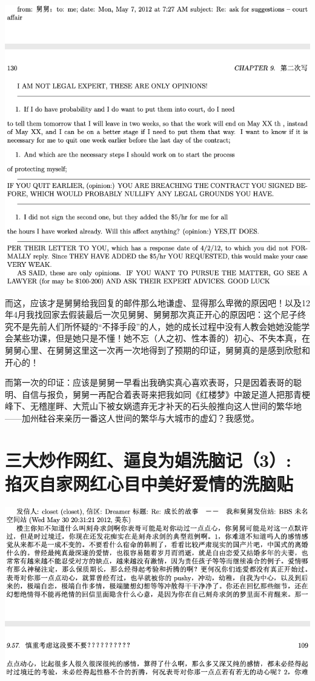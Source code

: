 \documentclass[9pt, b5paper]{article}
\begin{document}
\begin{center}
\includegraphics[width=.9\linewidth]{./pic/readme_20210412_175551.png}
\end{center}

而这，应该才是舅舅给我回复的邮件那么地谦虚、显得那么卑微的原因吧！以及12年4月我找回家去假装最后一次见舅舅、舅舅那次真正开心的原因吧：这个尼子终究不是先前人们所怀疑的“不择手段”的人，她的成长过程中没有人教会她她没能学会某些功课，但是她只是不懂！她不忘（人之初、性本善的）初心、不失本真，在舅舅心里、在舅舅这里这一次再一次地得到了预期的印证，舅舅真的是感到欣慰和开心的！

而第一次的印证：应该是舅舅一早看出我确实真心喜欢表哥，只是因着表哥的聪明、自信与报负，舅舅一再配合着表哥来把我如同《红楼梦》中跛足道人把那青梗峰下、无稽崖畔、大荒山下被女娲遗弃无才补天的石头般推向这人世间的繁华地——加州硅谷来亲历一番这人世间的繁华与大城市的虚幻？我感觉。

\section{三大炒作网红、逼良为娼洗脑记（3）: 掐灭自家网红心目中美好爱情的洗脑贴}
\label{sec:org0bba8ef}

\begin{center}
\includegraphics[width=.9\linewidth]{./pic/p1p108-3.png}
\end{center}
\end{document}
